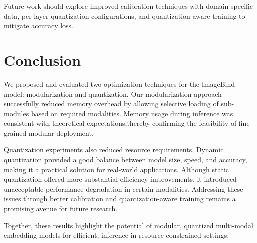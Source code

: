 \documentclass[runningheads]{IEEEtran}
\begin{document}
Future work should explore improved calibration techniques with domain-specific data, per-layer quantization configurations, and quantization-aware training to mitigate accuracy loss.

\section{Conclusion}

We proposed and evaluated two optimization techniques for the ImageBind model: modularization and quantization. Our modularization approach successfully reduced memory overhead by allowing selective loading of sub-modules based on required modalities. Memory usage during inference was consistent with theoretical expectations,thereby  confirming the feasibility of fine-grained modular deployment. 

Quantization experiments also reduced resource requirements. Dynamic quantization provided a good balance between model size, speed, and accuracy, making it a practical solution for real-world applications. Although static quantization offered more substantial efficiency improvements, it introduced unacceptable performance degradation in certain modalities. Addressing these issues through better calibration and quantization-aware training remains a promising avenue for future research.

Together, these results highlight the potential of modular, quantized multi-modal embedding models for efficient, inference in resource-constrained settings.



\end{document}
